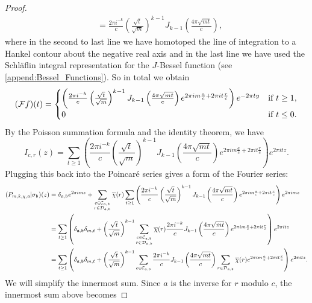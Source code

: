 \begin{proof}
\begin{align*}
        &= \frac{2\pi i^{-k}}{c}\left(\frac{\sqrt{t}}{\sqrt{m}}\right)^{k-1}J_{k-1}\left(\frac{4\pi\sqrt{mt}}{c}\right),
      \end{align*}
      where in the second to last line we have homotoped the line of integration to a Hankel contour about the negative real axis and in the last line we have used the Schl\"aflin integral representation for the $J$-Bessel function (see \cref{append:Bessel_Functions}). So in total we obtain
      \[
        (\mathcal{F}f)(t) = \begin{cases} \left(\frac{2\pi i^{-k}}{c}\left(\frac{\sqrt{t}}{\sqrt{m}}\right)^{k-1}J_{k-1}\left(\frac{4\pi\sqrt{mt}}{c}\right)e^{2\pi im\frac{a}{c}+2\pi it\frac{r}{c}}\right)e^{-2\pi ty} & \text{if $t \ge 1$}, \\ 0 & \text{if $t \le 0$}. \end{cases}
      \]
      By the Poisson summation formula and the identity theorem, we have
      \[
        I_{c,r}(z) = \sum_{t \ge 1}\left(\frac{2\pi i^{-k}}{c}\left(\frac{\sqrt{t}}{\sqrt{m}}\right)^{k-1}J_{k-1}\left(\frac{4\pi\sqrt{mt}}{c}\right)e^{2\pi im\frac{a}{c}+2\pi it\frac{r}{c}}\right)e^{2\pi itz}.
      \]
      Plugging this back into the Poincar\'e series gives a form of the Fourier series:
      \begin{align*}
        (P_{m,k,\chi,\mathfrak{a}}|\sigma_{\mathfrak{b}})(z) &= \delta_{\mathfrak{a},\mathfrak{b}}e^{2\pi imz}+\sum_{\substack{c \in \mathcal{C}_{\mathfrak{a},\mathfrak{b}} \\ r \in \mathcal{D}_{\mathfrak{a},\mathfrak{b}}}}\overline{\chi}(r)\sum_{t \ge 1}\left(\frac{2\pi i^{-k}}{c}\left(\frac{\sqrt{t}}{\sqrt{m}}\right)^{k-1}J_{k-1}\left(\frac{4\pi\sqrt{mt}}{c}\right)e^{2\pi im\frac{a}{c}+2\pi it\frac{r}{c}}\right)e^{2\pi imz} \\
        &= \sum_{t \ge 1}\left(\delta_{\mathfrak{a},\mathfrak{b}}\delta_{m,t}+\left(\frac{\sqrt{t}}{\sqrt{m}}\right)^{k-1}\sum_{\substack{c \in \mathcal{C}_{\mathfrak{a},\mathfrak{b}} \\ r \in \mathcal{D}_{\mathfrak{a},\mathfrak{b}}}}\overline{\chi}(r)\frac{2\pi i^{-k}}{c}J_{k-1}\left(\frac{4\pi\sqrt{mt}}{c}\right)e^{2\pi im\frac{a}{c}+2\pi it\frac{r}{c}}\right)e^{2\pi itz} \\
        &= \sum_{t \ge 1}\left(\delta_{\mathfrak{a},\mathfrak{b}}\delta_{m,t}+\left(\frac{\sqrt{t}}{\sqrt{m}}\right)^{k-1}\sum_{\substack{c \in \mathcal{C}_{\mathfrak{a},\mathfrak{b}}}}\frac{2\pi i^{-k}}{c}J_{k-1}\left(\frac{4\pi\sqrt{mt}}{c}\right)\sum_{r \in \mathcal{D}_{\mathfrak{a},\mathfrak{b}}}\overline{\chi}(r)e^{2\pi im\frac{a}{c}+2\pi it\frac{r}{c}}\right)e^{2\pi itz}.
      \end{align*}
      We will simplify the innermost sum. Since $a$ is the inverse for $r$ modulo $c$, the innermost sum above becomes

\end{proof}
